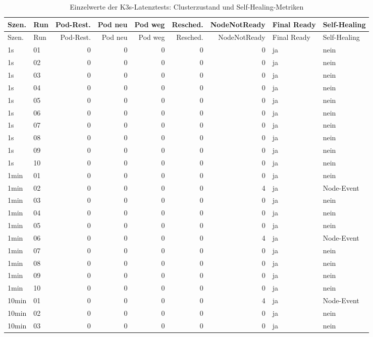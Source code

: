 \begin{longtable}{llrrrrrll}
\caption{Einzelwerte der K3s-Latenztests: Clusterzustand und Self-Healing-Metriken}\label{tab:appendix-k3s-latency-cluster}\\
\toprule
Szen. & Run & Pod-Rest. & Pod neu & Pod weg & Resched. & NodeNotReady & Final Ready & Self-Healing \\
\midrule
\endfirsthead
\toprule
Szen. & Run & Pod-Rest. & Pod neu & Pod weg & Resched. & NodeNotReady & Final Ready & Self-Healing \\
\midrule
\endhead
1s & 01 & 0 & 0 & 0 & 0 & 0 & ja & nein \\
1s & 02 & 0 & 0 & 0 & 0 & 0 & ja & nein \\
1s & 03 & 0 & 0 & 0 & 0 & 0 & ja & nein \\
1s & 04 & 0 & 0 & 0 & 0 & 0 & ja & nein \\
1s & 05 & 0 & 0 & 0 & 0 & 0 & ja & nein \\
1s & 06 & 0 & 0 & 0 & 0 & 0 & ja & nein \\
1s & 07 & 0 & 0 & 0 & 0 & 0 & ja & nein \\
1s & 08 & 0 & 0 & 0 & 0 & 0 & ja & nein \\
1s & 09 & 0 & 0 & 0 & 0 & 0 & ja & nein \\
1s & 10 & 0 & 0 & 0 & 0 & 0 & ja & nein \\
1min & 01 & 0 & 0 & 0 & 0 & 0 & ja & nein \\
1min & 02 & 0 & 0 & 0 & 0 & 4 & ja & Node-Event \\
1min & 03 & 0 & 0 & 0 & 0 & 0 & ja & nein \\
1min & 04 & 0 & 0 & 0 & 0 & 0 & ja & nein \\
1min & 05 & 0 & 0 & 0 & 0 & 0 & ja & nein \\
1min & 06 & 0 & 0 & 0 & 0 & 4 & ja & Node-Event \\
1min & 07 & 0 & 0 & 0 & 0 & 0 & ja & nein \\
1min & 08 & 0 & 0 & 0 & 0 & 0 & ja & nein \\
1min & 09 & 0 & 0 & 0 & 0 & 0 & ja & nein \\
1min & 10 & 0 & 0 & 0 & 0 & 0 & ja & nein \\
10min & 01 & 0 & 0 & 0 & 0 & 4 & ja & Node-Event \\
10min & 02 & 0 & 0 & 0 & 0 & 0 & ja & nein \\
10min & 03 & 0 & 0 & 0 & 0 & 0 & ja & nein \\

\end{longtable}
